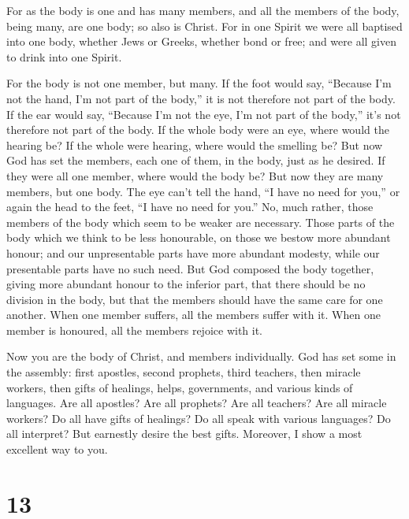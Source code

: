  For as the body is one and has many members, and all the
members of the body, being many, are one body; so also is Christ.
 For in one Spirit we were all baptised into one body,
whether Jews or Greeks, whether bond or free; and were all given to
drink into one Spirit.

 For the body is not one member, but many.
 If the foot would say, ``Because I'm not the hand, I'm
not part of the body,'' it is not therefore not part of the body.
 If the ear would say, ``Because I'm not the eye, I'm not
part of the body,'' it's not therefore not part of the body.
 If the whole body were an eye, where would the hearing
be? If the whole were hearing, where would the smelling be?
 But now God has set the members, each one of them, in
the body, just as he desired.  If they were all one
member, where would the body be?  But now they are many
members, but one body.  The eye can't tell the hand, ``I
have no need for you,'' or again the head to the feet, ``I have no need
for you.''  No, much rather, those members of the body
which seem to be weaker are necessary.  Those parts of
the body which we think to be less honourable, on those we bestow more
abundant honour; and our unpresentable parts have more abundant modesty,
 while our presentable parts have no such need. But God
composed the body together, giving more abundant honour to the inferior
part,  that there should be no division in the body, but
that the members should have the same care for one another.
 When one member suffers, all the members suffer with it.
When one member is honoured, all the members rejoice with it.

 Now you are the body of Christ, and members
individually.  God has set some in the assembly: first
apostles, second prophets, third teachers, then miracle workers, then
gifts of healings, helps, governments, and various kinds of languages.
 Are all apostles? Are all prophets? Are all teachers?
Are all miracle workers?  Do all have gifts of healings?
Do all speak with various languages? Do all interpret? 
But earnestly desire the best gifts. Moreover, I show a most excellent
way to you.

\hypertarget{section-12}{%
\section{13}\label{section-12}}

